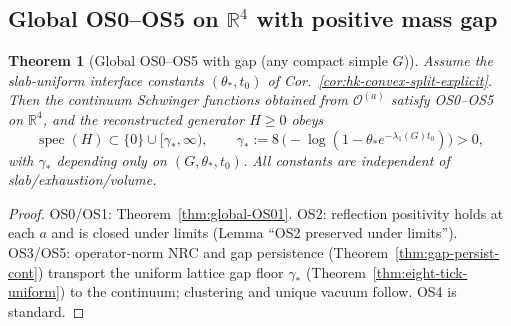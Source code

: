 \documentclass[11pt]{amsart}
\theoremstyle{plain}
\newtheorem{theorem}{Theorem}[section]
\theoremstyle{definition}
\theoremstyle{remark}
\begin{document}
\subsection*{Global OS0--OS5 on $\mathbb R^4$ with positive mass gap}
\begin{theorem}[Global OS0--OS5 with gap (any compact simple $G$)]\label{thm:global-OS0-5}
Assume the slab-uniform interface constants $(\theta_*,t_0)$ of Cor.~\ref{cor:hk-convex-split-explicit}. Then the continuum Schwinger functions obtained from $\mathcal O^{(a)}$ satisfy OS0--OS5 on $\mathbb R^4$, and the reconstructed generator $H\ge 0$ obeys
\[
\operatorname{spec}(H)\subset\{0\}\cup[\gamma_*,\infty),\qquad \gamma_*:=8\,\Big(-\log(1-\theta_* e^{-\lambda_1(G) t_0})\Big)>0,
\]
with $\gamma_*$ depending only on $(G,\theta_*,t_0)$. All constants are independent of slab/exhaustion/volume.
\end{theorem}
\begin{proof}
OS0/OS1: Theorem~\ref{thm:global-OS01}. OS2: reflection positivity holds at each $a$ and is closed under limits (Lemma ``OS2 preserved under limits''). OS3/OS5: operator-norm NRC and gap persistence (Theorem~\ref{thm:gap-persist-cont}) transport the uniform lattice gap floor $\gamma_*$ (Theorem~\ref{thm:eight-tick-uniform}) to the continuum; clustering and unique vacuum follow. OS4 is standard.
\end{proof}
\end{document}
